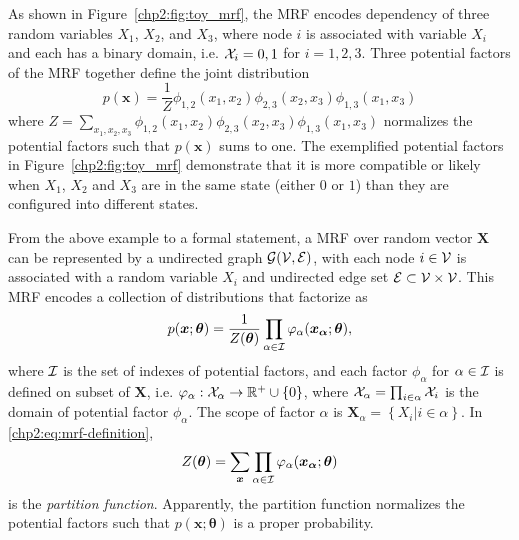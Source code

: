 \begin{example}\label{chpt2:mrf-3node-example}
  As shown in Figure~\ref{chp2:fig:toy_mrf}, the MRF encodes dependency of three random variables $X_1$, $X_2$, and $X_3$, where node $i$ is associated with variable $X_i$ and each has a binary domain, i.e. $\mathcal{X}_i = {0,1}$ for $i =1,2,3$. Three potential factors of the MRF together define the joint distribution
  \begin{equation*}
    p(\bm{x}) = \frac{1}{Z} \phi_{1,2}(x_1, x_2) \phi_{2,3}(x_2, x_3) \phi_{1,3}(x_1, x_3)
  \end{equation*}
  where $Z = \sum_{x_1, x_2, x_3}\phi_{1,2}(x_1, x_2) \phi_{2,3}(x_2, x_3) \phi_{1,3}(x_1, x_3)$ normalizes the potential factors such that $p(\bm{x})$ sums to one. The exemplified potential factors in Figure~\ref{chp2:fig:toy_mrf} demonstrate that it is more compatible or likely when $X_1$, $X_2$ and $X_3$ are in the same state (either $0$ or $1$) than they are configured into different states.
\end{example}

From the above example to a formal statement, a MRF over random vector $\bm{X}$ can be represented by a undirected graph $\mathcal{G}(\mathcal{V}, \mathcal{E})$, with each node $i \in \mathcal{V}$ is associated with a random variable $X_i$ and undirected edge set $\mathcal{E} \subset \mathcal{V} \times \mathcal{V}$. This MRF encodes a collection of distributions that factorize as
\begin{equation}\label{chp2:eq:mrf-definition}
  p(\bm{x};\bm{\theta}) = \frac{1}{Z(\bm{\theta})} \prod_{\alpha \in \mathcal{I}} \varphi_{\alpha}(\bm{x_{\alpha}};\bm{\theta}),
\end{equation}
where $\mathcal{I}$ is the set of indexes of potential factors, and each factor $\phi_{\alpha}$ for $\alpha\in \mathcal{I}$ is defined on subset of $\bm{X}$, i.e. $\varphi_{\alpha}: \mathcal{X}_{\alpha} \rightarrow \mathbb{R}^{+} \cup \{0\}$, where $\mathcal{X}_{\alpha} = \prod_{i\in \alpha}\mathcal{X}_i$ is the domain of potential factor $\phi_{\alpha}$. The scope of factor $\alpha$ is $\bm{X}_{\alpha} = \left\{ X_i| i\in \alpha \right\}$. In \eqref{chp2:eq:mrf-definition},
\begin{equation}
  Z(\bm{\theta}) = \sum_{\bm{x}} \prod_{\alpha \in \mathcal{I}} \varphi_{\alpha}(\bm{x_{\alpha}};\bm{\theta})
\end{equation}
is the \textit{partition function}. Apparently, the partition function normalizes the potential factors such that $p(\bm{x}; \bm{\theta})$ is a proper probability.

